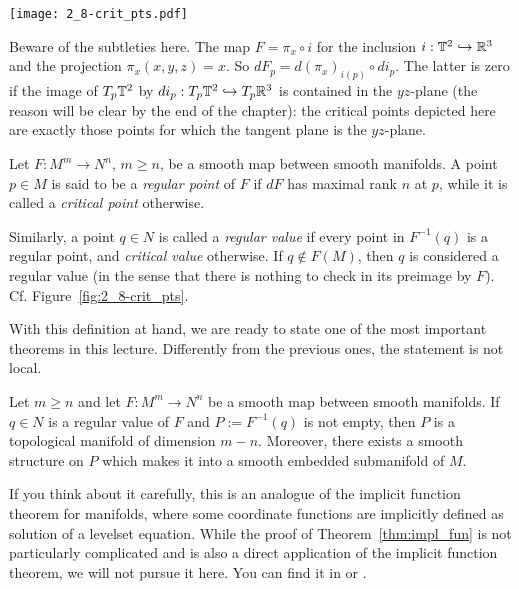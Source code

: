 \begin{marginfigure}
	\texttt{[image: 2\_8-crit\_pts.pdf]}
	\caption{Beware of the subtleties here. The map $F=\pi_x\circ i$ for the inclusion $i:\mathbb{T}^2\hookrightarrow\mathbb{R}^3$ and the projection $\pi_x(x,y,z)=x$.
		So $dF_p = d (\pi_x)_{i(p)} \circ d i_p$. The latter is zero if the image of $T_p\mathbb{T}^2$ by $d i_p: T_p\mathbb{T}^2\hookrightarrow T_p\mathbb{R}^3$ is contained in the $yz$-plane (the reason will be clear by the end of the chapter): the critical points depicted here are exactly those points for which the tangent plane is the $yz$-plane.}
	\label{fig:2_8-crit_pts}
\end{marginfigure}

\begin{definition}
	Let $F:M^m \to N^n$, $m\geq n$, be a smooth map between smooth manifolds.
	A point $p\in M$ is said to be a \emph{regular point} of $F$ if $dF$ has maximal rank $n$ at $p$, while it is called a \emph{critical point} otherwise.

	Similarly, a point $q\in N$ is called a \emph{regular value} if every point in $F^{-1}(q)$ is a regular point, and \emph{critical value} otherwise. If $q\not\in F(M)$, then $q$ is considered a regular value (in the sense that there is nothing to check in its preimage by $F$).
	Cf. Figure~\ref{fig:2_8-crit_pts}.
\end{definition}

With this definition at hand, we are ready to state one of the most important theorems in this lecture.
Differently from the previous ones, the statement is not local.

\begin{theorem}\label{thm:impl_fun}
	Let $m\geq n$ and let $F: M^m \to N^n$ be a smooth map between smooth manifolds.
	If $q\in N$ is a regular value of $F$ and $P := F^{-1}(q)$ is not empty, then $P$ is a topological manifold of dimension $m-n$.
	Moreover, there exists a smooth structure on $P$ which makes it into a smooth embedded submanifold of $M$.
\end{theorem}

If you think about it carefully, this is an analogue of the implicit function theorem for manifolds, where some coordinate functions are implicitly defined as solution of a levelset equation.
While the proof of Theorem~\ref{thm:impl_fun} is not particularly complicated and is also a direct application of the implicit function theorem, we will not pursue it here. You can find it in \cite[Theorem 5.12]{book:lee} or \cite[Theorem 9.9]{book:tu}.

